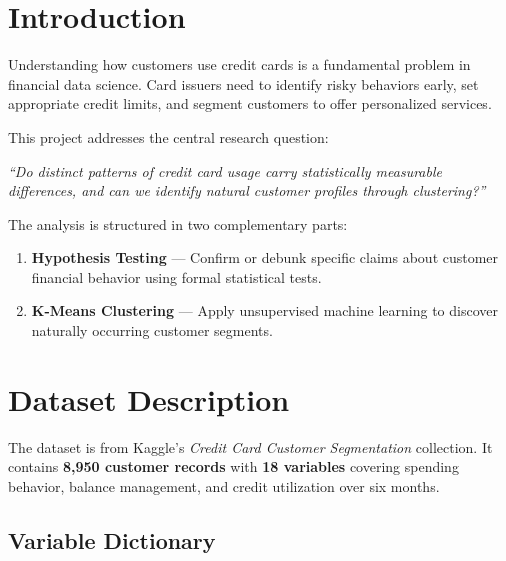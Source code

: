 \documentclass[12pt, letterpaper]{article}
\begin{document}
\section{Introduction}

Understanding how customers use credit cards is a fundamental problem in financial
data science. Card issuers need to identify risky behaviors early, set appropriate
credit limits, and segment customers to offer personalized services.

This project addresses the central research question:

\begin{center}
  \textit{\large ``Do distinct patterns of credit card usage carry statistically
  measurable differences, and can we identify natural customer profiles through
  clustering?''}
\end{center}

The analysis is structured in two complementary parts:

\begin{enumerate}
  \item \textbf{Hypothesis Testing} --- Confirm or debunk specific claims about
    customer financial behavior using formal statistical tests.
  \item \textbf{K-Means Clustering} --- Apply unsupervised machine learning to
    discover naturally occurring customer segments.
\end{enumerate}

\section{Dataset Description}

The dataset is from Kaggle's \textit{Credit Card Customer Segmentation} collection.
It contains \textbf{8{,}950 customer records} with \textbf{18 variables} covering
spending behavior, balance management, and credit utilization over six months.

\subsection{Variable Dictionary}
\end{document}
